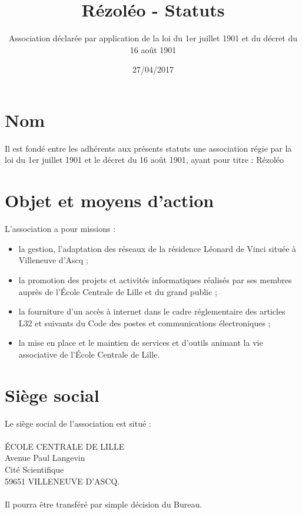 \documentclass[12pt]{constitution}
\begin{document}
	\title{Rézoléo - Statuts}
	\author{Association déclarée par application de la loi du 1er juillet 1901 et du décret du 16 août 1901}
	\date{27/04/2017}
	\maketitle
	\newpage


	\section{Nom}
Il est fondé entre les adhérents aux présents statuts une association régie par la loi du 1er juillet 1901 et le décret du 16 août 1901, ayant pour titre : Rézoléo

	\section{Objet et moyens d'action}
	L’association a pour missions :
	\begin{itemize}
		\item[\textbullet] la gestion, l'adaptation des réseaux de la résidence Léonard de Vinci située à Villeneuve d'Ascq ;
		\item[\textbullet]la promotion des projets et activités informatiques réalisés par ses membres auprès de l’École Centrale de Lille et du grand public ;
		\item[\textbullet] la fourniture d'un accès à internet dans le cadre réglementaire des articles L32 et suivants du Code des postes et communications électroniques ;
		\item[\textbullet] la mise en place et le maintien de services et d'outils animant la vie associative de l'École Centrale de Lille.
	\end{itemize}

	\section{Siège social}
	Le siège social de l'association est situé :\\
	\\
	\noindent ÉCOLE CENTRALE DE LILLE\\
	Avenue Paul Langevin\\
	Cité Scientifique\\
	59651 VILLENEUVE D’ASCQ.\\
	\\
	Il pourra être transféré par simple décision du Bureau.
\end{document}
